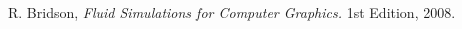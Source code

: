 \begin{thebibliography}{9}

  R. Bridson,
  \emph{Fluid Simulations for Computer Graphics.}
  1st Edition,
  2008.

\end{thebibliography}

